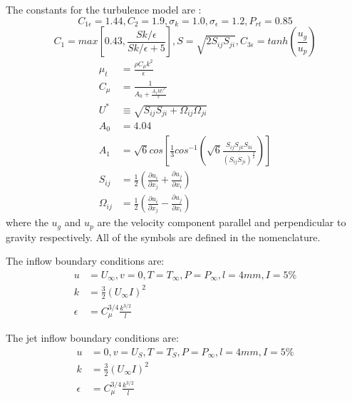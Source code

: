 \documentclass[preprint,12pt]{elsarticle}
\begin{document}
The constants for the turbulence model are \cite{realizable,fluent} : 
\begin{equation}
\label{eq:constants}
C_{1\epsilon} = 1.44 , C_2 = 1.9 , \sigma_k = 1.0 , \sigma_\epsilon = 1.2 , P_{rt} = 0.85 
\end{equation}
\begin{equation}
C_1 = max\left[0.43,\frac{Sk/\epsilon}{Sk/\epsilon +5} \right] , S = \sqrt{2S_{ij}S_{ji}} , C_{3\epsilon} = tanh\left(\frac{u_g}{u_p}\right)
\end{equation}
\begin{subequations}
\begin{align}
\mu_t &= \frac{\rho C_{\mu} k^2}{\epsilon} \\
C_{\mu} &= \frac{1}{A_0 + \frac{A_1 k U^*}{\epsilon}} \\
U^* &\equiv \sqrt{S_{ij} S_{ji} + \Omega_{ij} \Omega_{ji}} \\
A_0 &= 4.04 \\
A_1 &= \sqrt{6} cos \left[\frac{1}{3} cos^{-1}\left(\sqrt{6} \frac{S_{ij}S_{jk}S_{ki}}{\left(S_{ij} S_{ji} \right)^{\frac{3}{2}}} \right) \right] \\
S_{ij} &= \frac{1}{2} \left( \frac{\partial u_i}{\partial x_j} + \frac{\partial u_j}{\partial x_i} \right) \\
\Omega_{ij} &= \frac{1}{2} \left( \frac{\partial u_i}{\partial x_j} - \frac{\partial u_j}{\partial x_i} \right)
\end{align}
\end{subequations}
where the $u_g$ and $u_p$ are the velocity component parallel and perpendicular to gravity respectively.  All of the symbols are defined in the nomenclature.

The inflow boundary conditions are:
\begin{subequations}
\label{eq:inflow}
\begin{align}
u&=U_\infty , v=0 , T=T_\infty , P = P_\infty , l=4 mm , I=5\%\\
k&=\frac{3}{2}\left(U_\infty I\right)^2 \\
\epsilon &=C_{\mu}^{3/4} \frac{k^{3/2}}{l}
\end{align}
\end{subequations}

The jet inflow boundary conditions are:
\begin{subequations}
\label{eq:inflowjet}
\begin{align}
u&=0 , v=U_S , T=T_S , P = P_\infty , l=4 mm , I=5\%\\
k&=\frac{3}{2}\left(U_\infty I\right)^2 \\
\epsilon &=C_{\mu}^{3/4} \frac{k^{3/2}}{l}
\end{align}
\end{subequations}
\end{document}
